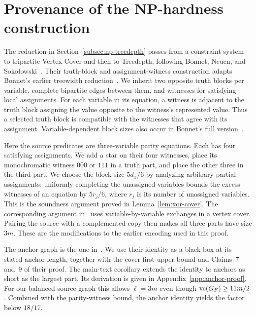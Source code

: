 \section{Provenance of the \textup{NP}-hardness construction}
\label{sec:source-normalizations}
\label{subsec:np-provenance}

The reduction in Section~\ref{subsec:np-treedepth} passes from a constraint
system to tripartite Vertex Cover and then to Treedepth, following
Bonnet, Neuen, and Soko\l owski~\cite[Sections~3 and~4]{BNS}. Their
truth-block and assignment-witness construction adapts Bonnet's earlier
treewidth reduction~\cite[full version, Section~3.1]{BonnetTreewidth}.
We inherit two opposite truth blocks per variable, complete bipartite
edges between them, and witnesses for satisfying local assignments.
For each variable in its equation, a witness is adjacent to the truth
block assigning the value opposite to the witness's represented value.
Thus a selected truth block is compatible with the witnesses
that agree with its assignment. Variable-dependent block
sizes also occur in Bonnet's full version~\cite[Section~3.5]{BonnetTreewidth}.

Here the source predicates are three-variable parity equations. Each
has four satisfying assignments. We add a star on their four
witnesses, place its monochromatic witness $000$ or $111$ in a truth
part, and place the other three in the third part. We choose the block
size $5d_x/6$ by analyzing arbitrary partial assignments: uniformly
completing the unassigned variables bounds the excess witnesses of an
equation by $5r_j/6$, where $r_j$ is its number of unassigned variables.
This is the soundness argument proved in Lemma~\ref{lem:xor-cover}.
The corresponding argument in~\cite[proof of Lemma~10]{BNS} uses
variable-by-variable exchanges in a vertex cover.
Pairing the source with a complemented copy then makes all three
parts have size $3m$. These are the modifications to the earlier
encoding used in this proof.

The anchor graph is the one in~\cite[Lemma~6]{BNS}. We use their
identity as a black box at its stated anchor length, together
with the cover-first upper bound and Claims~7 and~9 of their proof.
The main-text corollary extends the identity to anchors as short
as the largest part. Its derivation is given in
Appendix~\ref{app:anchor-proof}. For our balanced source graph this
allows $\ell=3m$ even though $\operatorname{vc}(G_F)\ge11m/2$. Combined with the
parity-witness bound, the anchor identity yields the factor below
$18/17$.
